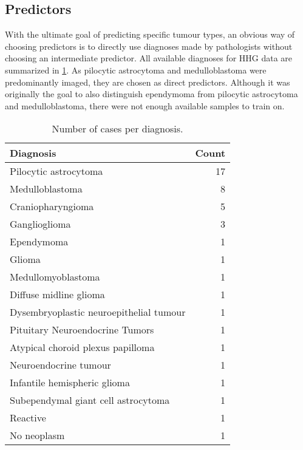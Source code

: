 \subsection{Predictors}
With the ultimate goal of predicting specific tumour types, an obvious way of choosing predictors is to directly use diagnoses made by pathologists without choosing an intermediate predictor.
All available diagnoses for HHG data are summarized in \cref{tab:available_data}.
As pilocytic astrocytoma and medulloblastoma were predominantly imaged, they are chosen as direct predictors.
Although it was originally the goal to also distinguish ependymoma from pilocytic astrocytoma and medulloblastoma, there were not enough available samples to train on.

\begin{table}
    \caption[Number of cases per diagnosis]{
        Number of cases per diagnosis.
    }
    \label{tab:available_data}
    \begin{tabular}{lr}
        \toprule
        Diagnosis &  Count \\
        \midrule
        Pilocytic astrocytoma               &         17 \\
        Medulloblastoma                     &          8 \\
        Craniopharyngioma                   &          5 \\
        Ganglioglioma                       &          3 \\
        Ependymoma                          &          1 \\
        Glioma                              &          1 \\
        Medullomyoblastoma                  &          1 \\
        Diffuse midline glioma              &          1 \\
        Dysembryoplastic neuroepithelial tumour  &          1 \\
        Pituitary Neuroendocrine Tumors               &          1 \\
        Atypical choroid plexus papilloma   &          1 \\
        Neuroendocrine tumour                &          1 \\
        Infantile hemispheric glioma        &          1 \\
        Subependymal giant cell astrocytoma &          1 \\
        Reactive                            &          1 \\
        No neoplasm                         &          1 \\
        \bottomrule
    \end{tabular}
\end{table}
